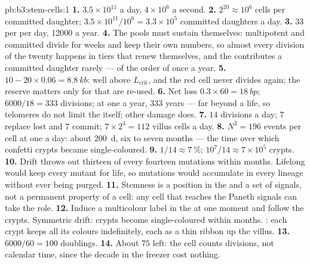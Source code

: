 \begin{solution}{pb:b3:stem-cells:1}
\textbf{1.} $3.5\times 10^{11}$ a day, $4\times 10^{6}$ a second.
\textbf{2.} $2^{20} \approx 10^{6}$ cells per committed daughter;
$3.5\times 10^{11}/10^{6} = 3.3\times 10^{5}$ committed daughters a day.
\textbf{3.} $33$ per  per day, \num{12000} a year.
\textbf{4.} The  pools must sustain themselves: multipotent
and committed  divide for weeks and keep their own numbers,
so almost every division of the twenty happens in tiers that renew
themselves, and the  contributes a committed daughter rarely
--- of the order of once a year.
\textbf{5.} $10 - 20\times 0.06 = \qty{8.8}{kb}$: well above
$L_{\text{crit}}$, and the red cell never divides again; the reserve
matters only for  that are re-used.
\textbf{6.} Net loss $0.3\times 60 = \qty{18}{bp}$; $6000/18 = 333$
divisions; at one a year, $333$ years --- far beyond a life, so
telomeres do not limit the  itself; other damage does.
\textbf{7.} $14$ divisions a day; $7$ replace lost  and $7$
commit; $7\times 2^{4} = 112$ villus cells a day.
\textbf{8.} $N^{2} = 196$ events per cell at one a day: about
\qty{200}{d}, six to seven months --- the time over which confetti
crypts became single-coloured.
\textbf{9.} $1/14 \approx \qty{7}{\%}$; $10^{7}/14 \approx 7\times 10^{5}$
crypts.
\textbf{10.} Drift throws out thirteen of every fourteen mutations
within months. Lifelong  would keep every mutant
 for life, so mutations would accumulate in every lineage
without ever being purged.
\textbf{11.} Stemness is a position in the  and a set of signals,
not a permanent property of a cell: any cell that reaches the Paneth
signals can take the role.
\textbf{12.} Induce a multicolour label in the  at one moment
and follow the crypts. Symmetric drift: crypts become single-coloured
within months. : each crypt keeps all its colours
indefinitely, each as a thin ribbon up the villus.
\textbf{13.} $6000/60 = 100$ doublings.
\textbf{14.} About $75$ left: the cell counts divisions, not calendar
time, since the decade in the freezer cost nothing.

\end{solution}

